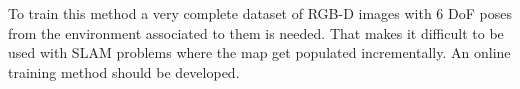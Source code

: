 To train this method a very complete dataset of RGB-D images with 6 DoF poses from the environment associated to them is needed. That makes it difficult to be used with SLAM problems where the map get populated incrementally. An online training  method should be developed.\\








